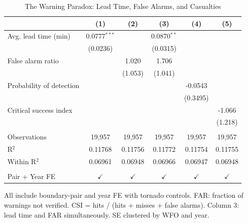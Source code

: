 
\begin{table}[htbp]
   \caption{\label{tab:mechanism} The Warning Paradox: Lead Time, False Alarms, and Casualties}
   \bigskip
   \centering
   \begin{tabular}{lccccc}
      \toprule
                               & (1)            & (2)           & (3)           & (4)           & (5)\\  
      \midrule 
      Avg. lead time (min)     & 0.0777$^{***}$ &               & 0.0870$^{**}$ &               &   \\   
                               & (0.0236)       &               & (0.0315)      &               &   \\   
      False alarm ratio        &                & 1.020         & 1.706         &               &   \\   
                               &                & (1.053)       & (1.041)       &               &   \\   
      Probability of detection &                &               &               & -0.0543       &   \\   
                               &                &               &               & (0.3495)      &   \\   
      Critical success index   &                &               &               &               & -1.066\\   
                               &                &               &               &               & (1.218)\\   
       \\
      Observations             & 19,957         & 19,957        & 19,957        & 19,957        & 19,957\\  
      R$^2$                    & 0.11768        & 0.11756       & 0.11772       & 0.11754       & 0.11755\\  
      Within R$^2$             & 0.06961        & 0.06948       & 0.06966       & 0.06947       & 0.06948\\  
       \\
      Pair + Year FE           & $\checkmark$   & $\checkmark$  & $\checkmark$  & $\checkmark$  & $\checkmark$\\   
      \bottomrule
   \end{tabular}
   
   \par \raggedright 
   All include boundary-pair and year FE with tornado controls. FAR: fraction of warnings not verified. CSI = hits / (hits + misses + false alarms). Column 3: lead time and FAR simultaneously. SE clustered by WFO and year.
\end{table}


